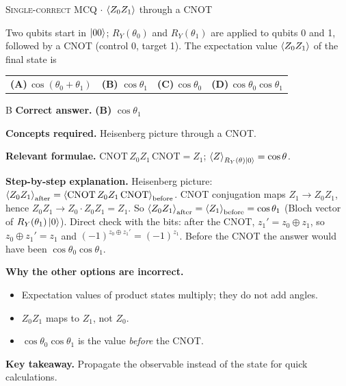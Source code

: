 \documentclass[11pt,a4paper]{article}
\newcommand{\optlabel}[1]{\textbf{(#1)}}
\newcommand{\correctlabel}[1]{\textcolor{okgreen}{\textbf{(#1)}\,\ding{51}}}
\newenvironment{qitem}[1]{\begin{list}{}{\setlength{\leftmargin}{3.3em}\setlength{\labelwidth}{3.1em}%
  \setlength{\labelsep}{0.2em}\setlength{\topsep}{3pt}\setlength{\parsep}{3pt}}\item[\textbf{Q.#1}\hfill]}{\end{list}}
\newcommand{\qsep}{\par\vspace{2pt}{\color{black!15}\hrule}\vspace{4pt}}
\newcommand{\qmeta}[2]{{\footnotesize\color{black!60}\textsc{#1} \;$\cdot$\; #2}\par}
\begin{document}
\begin{qitem}{34}
\qmeta{Single-correct MCQ}{$\braket{Z_0Z_1}$ through a CNOT}
Two qubits start in $\ket{00}$; $R_Y(\theta_0)$ and $R_Y(\theta_1)$ are applied to qubits 0 and 1, followed by a CNOT (control 0, target 1). The
expectation value $\braket{Z_0Z_1}$ of the final state is
\par\smallskip\noindent\begin{tabularx}{\linewidth}{@{}*{4}{L}@{}}
\optlabel{A}\,$\cos(\theta_0 + \theta_1)$ & \correctlabel{B}\,$\cos\theta_1$ & \optlabel{C}\,$\cos\theta_0$ & \optlabel{D}\,$\cos\theta_0\cos\theta_1$
\end{tabularx}
\end{qitem}
\begin{solbox}{B}
\textbf{\color{brand}Correct answer.} \textcolor{okgreen}{\textbf{(B)}} $\cos\theta_1$

\textbf{\color{brand}Concepts required.} Heisenberg picture through a CNOT.

\textbf{\color{brand}Relevant formulae.} $\mathrm{CNOT}\,Z_0Z_1\,\mathrm{CNOT} = Z_1$; $\braket{Z}_{R_Y(\theta)\ket0} = \cos\theta$.

\textbf{\color{brand}Step-by-step explanation.} Heisenberg picture: $\braket{Z_0Z_1}_{\text{after}} = \braket{\mathrm{CNOT}\,Z_0Z_1\,\mathrm{CNOT}}_{\text{before}}$. CNOT conjugation maps $Z_1 \to Z_0Z_1$, hence
$Z_0Z_1 \to Z_0\cdot Z_0Z_1 = Z_1$. So $\braket{Z_0Z_1}_{\text{after}} = \braket{Z_1}_{\text{before}} = \cos\theta_1$ (Bloch vector of $R_Y(\theta_1)\ket0$).
Direct check with the bits: after the CNOT, $z_1' = z_0\oplus z_1$, so $z_0 \oplus z_1' = z_1$ and $(-1)^{z_0\oplus z_1'} = (-1)^{z_1}$. Before the CNOT the
answer would have been $\cos\theta_0\cos\theta_1$.

\textbf{\color{brand}Why the other options are incorrect.}
\begin{itemize}[leftmargin=2.4em, itemsep=1pt, topsep=2pt]
\item[\textbf{(A)}] Expectation values of product states multiply; they do not add angles.
\item[\textbf{(C)}] $Z_0Z_1$ maps to $Z_1$, not $Z_0$.
\item[\textbf{(D)}] $\cos\theta_0\cos\theta_1$ is the value \emph{before} the CNOT.
\end{itemize}
\textbf{\color{brand}Key takeaway.} Propagate the observable instead of the state for quick calculations.
\end{solbox}
\qsep
\end{document}

